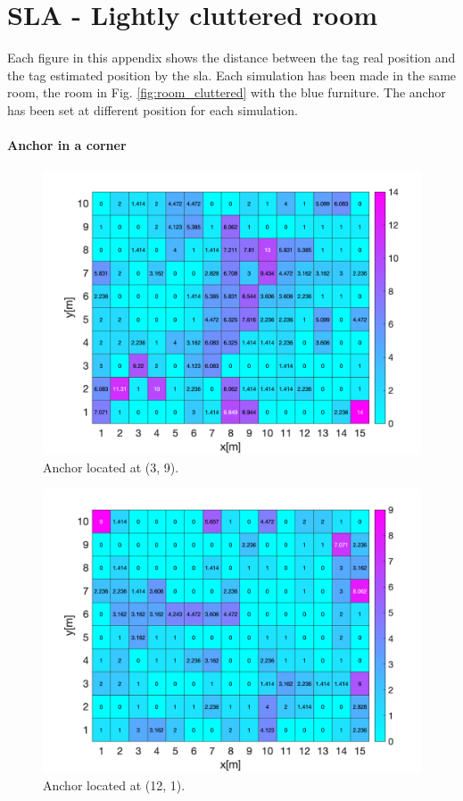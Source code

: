 \chapter{SLA - Lightly cluttered room}
\label{app:sla}

Each figure in this appendix shows the distance between the tag real position and the tag estimated position by the \gls{sla}. Each simulation has been made in the same room, the room in Fig. \ref{fig:room_cluttered} with the blue furniture. The anchor has been set at different position for each simulation. 

\subsubsection*{Anchor in a corner}

\begin{figure}[H]
\centering
\includegraphics[width=.9\linewidth]{Images/Anchor_at_(3_9).png}
\caption{Anchor located at (3, 9).}
\end{figure}

\begin{figure}[H]
\centering
\includegraphics[width=.9\linewidth]{Images/Anchor_at_(12_1).png}
\caption{Anchor located at (12, 1).}
\end{figure}

